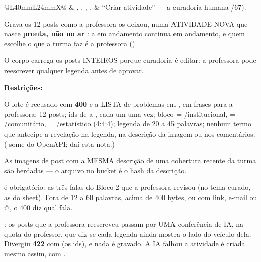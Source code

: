 \begin{tabularx}{\linewidth}{@{}L{40mm}L{24mm}X@{}}
\zebra {} & , , , ,  & \enquote{Criar atividade} --- a curadoria humana /67).\par Grava os 12 posts como a professora os deixou, numa ATIVIDADE NOVA que nasce \textbf{pronta, não no ar} : a em andamento continua em andamento, e quem escolhe o que a turma faz é a professora ().\par O corpo carrega os posts INTEIROS porque curadoria é editar: a professora pode reescrever qualquer legenda antes de aprovar.\par \textbf{Restrições:}\par \hspace*{1em}\textbullet{} O lote é recusado com \textbf{400}  e a LISTA de problemas em , em frases para a professora: 12 posts; ids de  a , cada um uma vez; bloco  = /institucional,  = /comunitário,  = /estatístico (4:4:4); legenda de 20 a 45 palavras; nenhum termo que antecipe a revelação na legenda, na descrição da imagem ou nos comentários. ( some do OpenAPI; daí esta nota.)\par \hspace*{1em}\textbullet{} As imagens de post com a MESMA descrição de uma cobertura recente da turma são herdadas --- o arquivo no bucket é o hash da descrição.\par \hspace*{1em}\textbullet{}  é obrigatório: as três falas do Bloco 2 que a professora revisou (no tema curado, as do sheet). Fora de 12 a 60 palavras, acima de 400 bytes, ou com link, e-mail ou @, o 400  diz qual fala.\par \hspace*{1em}\textbullet{}  : os posts que a professora reescreveu passam por UMA conferência de IA, na quota do professor, que diz se cada legenda ainda mostra o lado do veículo dela. Divergiu \seta{} \textbf{422}  com  (os ids), e nada é gravado. A IA falhou \seta{} a atividade é criada mesmo assim, com .\\

\end{tabularx}
